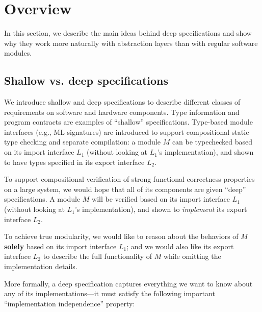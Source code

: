 
\chapter{Overview}
\label{chap-overview}

In this section, we describe the main ideas behind deep
specifications and show why they work more naturally with
abstraction layers than with regular software modules.

\section{Shallow vs. deep specifications}
We introduce shallow and deep specifications to describe different
classes of requirements on software and hardware components.  Type
information and program contracts are examples of ``shallow''
specifications. Type-based module interfaces (e.g., ML signatures) are
introduced to support compositional static type checking and separate
compilation: a module $M$ can be typechecked based on its import
interface $L_1$ (without looking at $L_1$'s implementation), and shown to
have types specified in its export interface $L_2$.

To support compositional verification of strong functional correctness
properties on a large system, we would hope that all of its components
are given ``deep'' specifications.  A module $M$ will be verified based on
its import interface $L_1$ (without looking at $L_1$'s
implementation), and shown to {\em implement} its export interface 
$L_2$.

To achieve true modularity, we would like to reason about the
behaviors of $M$ {\bf solely} based on its import interface $L_1$; and
we would also like its export interface $L_2$ to describe the full
functionality of $M$ while omitting the implementation details.


More formally, a deep specification captures everything we want to know
about any of its implementations---it must satisfy the following
important ``implementation independence'' property:

